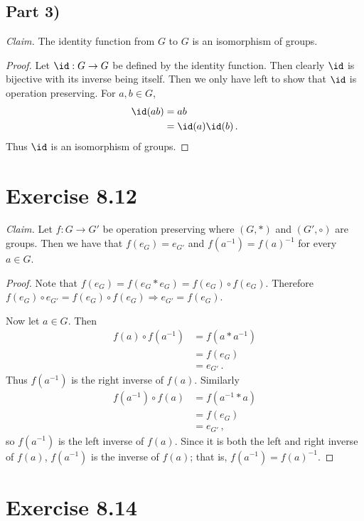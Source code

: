 \documentclass{abrice}
\newcommand{\Claim}{\noindent\emph{Claim.}\xspace}%
\begin{document}
\subsection{Part 3)}

\Claim The identity function from $G$ to $G$ is an isomorphism of groups.

\begin{proof}
  Let $\id : G \to G$ be defined by the identity function. Then clearly $\id$ is
  bijective with its inverse being itself. Then we only have left to show that $\id$ is
  operation preserving. For $a,b \in G$,
  \begin{align*}
    \id(ab)
    &= ab \\
    &= \id(a) \id(b)\, .
  \end{align*}
  Thus $\id$ is an isomorphism of groups.
\end{proof}

\section{Exercise 8.12}

\Claim Let $f : G \to G'$ be operation preserving where $(G,*)$ and $(G',
\circ)$ are groups. Then we have that $f(e_G) = e_{G'}$ and $f(a^{-1}) =
{f(a)}^{-1}$ for every $a \in G$.

\begin{proof}
  Note that $f(e_G) = f(e_G * e_G) = f(e_G) \circ f(e_G)$. Therefore $f(e_G)
  \circ e_{G'} = f(e_G) \circ f(e_G) \Rightarrow e_{G'} = f(e_G)$.

  Now let $a \in G$. Then
  \begin{align*}
    f(a) \circ f(a^{-1})
    &= f(a * a^{-1}) \\
    &= f(e_G) \\
    &= e_{G'}\, .
  \end{align*}
  Thus $f(a^{-1})$ is the right inverse of $f(a)$. Similarly
  \begin{align*}
    f(a^{-1}) \circ f(a)
    &= f(a^{-1} * a) \\
    &= f(e_G) \\
    &= e_{G'}\, ,
  \end{align*}
  so $f(a^{-1})$ is the left inverse of $f(a)$. Since it is both the left and
  right inverse of $f(a)$, $f(a^{-1})$ is the inverse of $f(a)$; that is,
  $f(a^{-1}) = {f(a)}^{-1}$.
\end{proof}

\section{Exercise 8.14}
\end{document}
